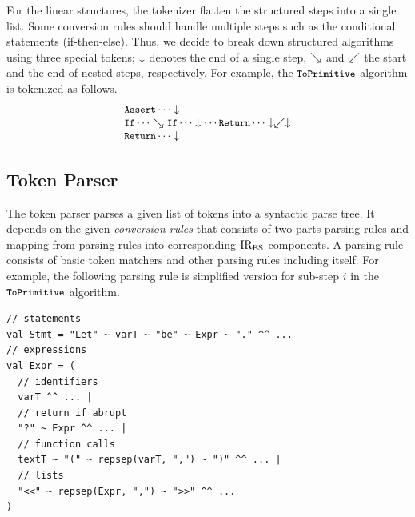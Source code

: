 For the linear structures, the tokenizer flatten the structured steps into
a single list. Some conversion rules should handle multiple steps such as
the conditional statements (if-then-else). Thus, we decide to break down
structured algorithms using three special tokens;
\( \downarrow \) denotes the end of a single step,
\( \searrow \) and \( \swarrow \) the start and the end of nested steps, respectively.
For example, the \( \texttt{\small ToPrimitive} \) algorithm is tokenized as follows.
\[
  \begin{array}{l}
    \texttt{\small Assert} \cdots \downarrow\\
    \texttt{\small If} \cdots \searrow \texttt{\small If} \cdots \downarrow
    \cdots \texttt{\small Return} \cdots \downarrow \swarrow \downarrow\\
    \texttt{\small Return} \cdots \downarrow\\
  \end{array}
\]

\subsection{Token Parser}

The token parser parses a given list of tokens into a syntactic parse tree.
It depends on the given \textit{conversion rules} that consists of
two parts parsing rules and mapping from parsing rules into corresponding
\( \text{IR}_\text{ES} \) components.
A parsing rule consists of basic token matchers and other parsing rules
including itself. For example, the following parsing rule is simplified version for
sub-step \( i \) in the \( \texttt{\small ToPrimitive} \) algorithm.
\begin{lstlisting}[style=myScalastyle]
// statements
val Stmt = "Let" ~ varT ~ "be" ~ Expr ~ "." ^^ ...
// expressions
val Expr = (
  // identifiers
  varT ^^ ... |
  // return if abrupt
  "?" ~ Expr ^^ ... |
  // function calls
  textT ~ "(" ~ repsep(varT, ",") ~ ")" ^^ ... |
  // lists
  "<<" ~ repsep(Expr, ",") ~ ">>" ^^ ...
)
\end{lstlisting}

